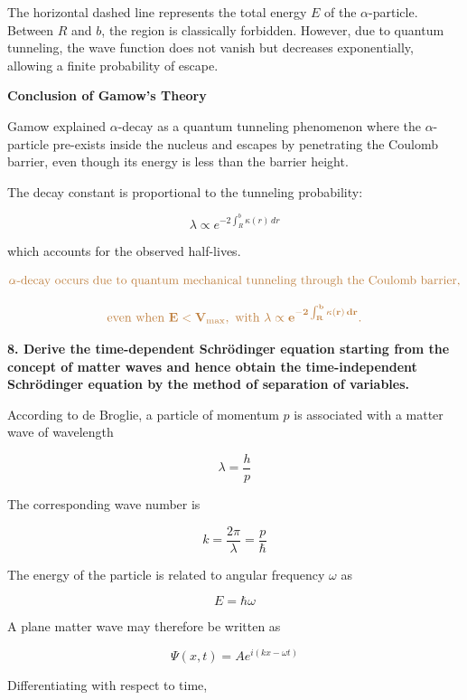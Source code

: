 \documentclass[a4paper, 12pt]{article}
\begin{document}
The horizontal dashed line represents the total energy $E$ of the $\alpha$-particle. 
Between $R$ and $b$, the region is classically forbidden. 
However, due to quantum tunneling, the wave function does not vanish but decreases exponentially, allowing a finite probability of escape.

\vspace{0.4cm}

\textbf{Conclusion of Gamow's Theory}

Gamow explained $\alpha$-decay as a quantum tunneling phenomenon where the $\alpha$-particle pre-exists inside the nucleus and escapes by penetrating the Coulomb barrier, even though its energy is less than the barrier height.

The decay constant is proportional to the tunneling probability:

\[
\lambda \propto e^{-2 \int_R^b \kappa(r)\, dr}
\]

which accounts for the observed half-lives.

\vspace{0.5cm}

\[
\textcolor{brown}{\mathbf{\alpha\text{-decay occurs due to quantum mechanical tunneling through the Coulomb barrier,}}}
\]

\[
\textcolor{brown}{\mathbf{\text{even when } E < V_{\text{max}}, \text{ with } \lambda \propto e^{-2 \int_R^b \kappa(r)\, dr}.}}
\]



\textbf{8. Derive the time-dependent Schrödinger equation starting from the concept of matter waves and hence obtain the time-independent Schrödinger equation by the method of separation of variables.}

\vspace{0.3cm}

According to de Broglie, a particle of momentum $p$ is associated with a matter wave of wavelength

\[
\lambda = \frac{h}{p}
\]

The corresponding wave number is

\[
k = \frac{2\pi}{\lambda} = \frac{p}{\hbar}
\]

The energy of the particle is related to angular frequency $\omega$ as

\[
E = \hbar \omega
\]

A plane matter wave may therefore be written as

\[
\Psi(x,t) = A e^{i(kx-\omega t)}
\]

Differentiating with respect to time,
\end{document}
